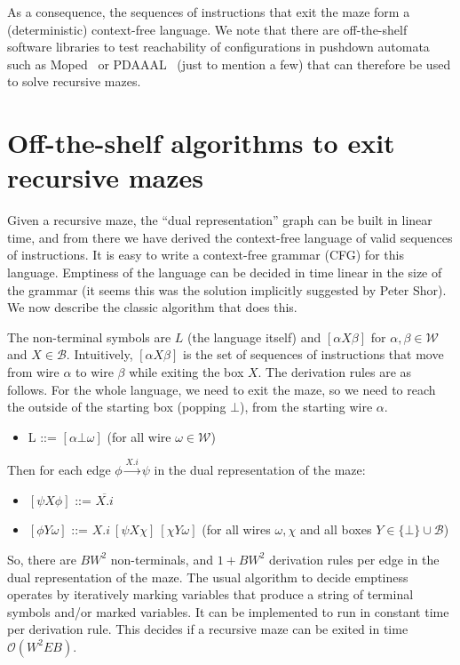 \documentclass[a4paper,UKenglish,cleveref, autoref]{lipics-v2021}
\newcommand{\bigO}[1]{\ensuremath{\mathcal{O}\left( #1 \right)} }
\begin{document}
As a consequence, the sequences of instructions that exit the maze form a
(deterministic) context-free language. We note that there are off-the-shelf
software libraries to test reachability of configurations in pushdown automata
such as \textsf{Moped}~\cite{DBLP:phd/dnb/Schwoon02} or
\textsf{PDAAAL}~\cite{DBLP:conf/atva/JensenSSS22} (just to mention a few) that
can therefore be used to solve recursive mazes.


\section{Off-the-shelf algorithms to exit recursive mazes}
\label{sec:shelf}

Given a recursive maze, the ``dual representation'' graph can be built in linear
time, and from there we have derived the context-free language of valid
sequences of instructions. It is easy to write a context-free grammar (CFG) for
this language. Emptiness of the language can be decided in time linear in the
size of the grammar (it seems this was the solution implicitly suggested by
Peter Shor). We now describe the classic algorithm that does this.

The non-terminal symbols are $L$ (the language itself) and $[\alpha X \beta]$
for $\alpha, \beta \in \mathcal{W}$ and $X \in \mathcal{B}$. Intuitively,
$[\alpha X \beta]$ is the set of sequences of instructions that move from wire
$\alpha$ to wire $\beta$ while exiting the box $X$. The derivation rules are as
follows. For the whole language, we need to exit the maze, so we need to reach
the outside of the starting box (popping $\bot$), from the starting wire $\alpha$.
\begin{itemize}
\item L ::= $[\alpha \bot \omega]$ \hfill (for all wire $\omega \in \mathcal{W}$)  
\end{itemize}
\noindent Then for each edge $\phi \xrightarrow{X.i} \psi$ in the dual representation of
the maze:
\begin{itemize}
\item $[\psi X \phi]$ ::= $\overline{X.i}$
\item $[\phi Y \omega]$ ::= $X.i ~ [\psi X \chi] ~ [\chi Y \omega]$ \hfill (for all wires $\omega, \chi$ and all boxes $Y \in \{\bot\} \cup \mathcal{B}$)
\end{itemize}

So, there are $BW^2$ non-terminals, and $1 + BW^2$ derivation rules per edge in
the dual representation of the maze. The usual algorithm to decide emptiness
operates by iteratively marking variables that produce a string of terminal
symbols and/or marked variables. It can be implemented to run in constant time
per derivation rule. This decides if a recursive maze can be exited in time $\bigO{W^2EB}$.
\end{document}
